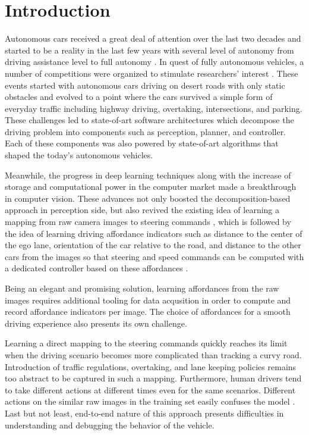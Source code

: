 \chapter{Introduction}
\label{chp:b1}

Autonomous cars received a great deal of attention over the last two decades
and started to be a reality in the last few years with several level of
autonomy from driving assistance level to full autonomy
\cite{Holstein2018EthicalAS}. In quest of fully autonomous vehicles, a number
of competitions were organized to stimulate researchers' interest
\cite{Buehler2007The2D, Buehler2009TheDU}. These events started with autonomous
cars driving on desert roads with only static obstacles and evolved to a point
where the cars survived a simple form of everyday traffic including highway
driving, overtaking, intersections, and parking. These challenges led to
state-of-art software architectures which decompose the driving problem into
components such as perception, planner, and controller. Each of these
components was also powered by state-of-art algorithms that shaped the today's
autonomous vehicles.

Meanwhile, the progress in deep learning techniques along with the increase of
storage and computational power in the computer market made a breakthrough in
computer vision. These advances not only boosted the decomposition-based
approach in perception side, but also revived the existing idea of learning a
mapping from raw camera images to steering commands \cite{Bojarski2016EndTE},
which is followed by the idea of learning driving affordance indicators such as
distance to the center of the ego lane, orientation of the car relative to the
road, and distance to the other cars from the images so that steering and speed
commands can be computed with a dedicated controller based on these affordances
\cite{Chen2015DeepDrivingLA}.

Being an elegant and promising solution, learning affordances from the raw
images requires additional tooling for data acqusition in order to compute and
record affordance indicators per image. The choice of affordances for a smooth
driving experience also presents its own challenge.

Learning a direct mapping to the steering commands quickly reaches its limit
when the driving scenario becomes more complicated than tracking a curvy
road. Introduction of traffic regulations, overtaking, and lane keeping
policies remains too abstract to be captured in such a mapping. Furthermore,
human drivers tend to take different actions at different times even for the
same scenarios. Different actions on the similar raw images in the training set
easily confuses the model \cite{Chen2015DeepDrivingLA}. Last but not least,
end-to-end nature of this approach presents difficulties in understanding and
debugging the behavior of the vehicle.

